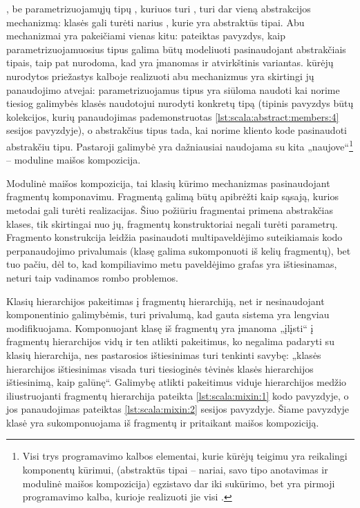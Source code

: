 , be parametrizuojamųjų tipų , kuriuos
turi , turi dar vieną abstrakcijos mechanizmą:
 klasės gali turėti narius , kurie
yra abstraktūs tipai. Abu mechanizmai yra pakeičiami vienas kitu:
\cite[10]{scala-overview} pateiktas pavyzdys, kaip parametrizuojamuosius
tipus galima būtų modeliuoti pasinaudojant abstrakčiais tipais, taip
pat nurodoma, kad yra įmanomas ir atvirkštinis variantas.
 kūrėjų \cite[11]{scala-overview} nurodytos
priežastys kalboje realizuoti abu mechanizmus yra skirtingi jų
panaudojimo atvejai: parametrizuojamus tipus yra siūloma naudoti kai
norime tiesiog galimybės klasės naudotojui nurodyti konkretų tipą
(tipinis pavyzdys būtų kolekcijos, kurių panaudojimas pademonstruotas
\ref{lst:scala:abstract:members:4}  sesijos
pavyzdyje), o abstrakčius tipus tada, kai norime kliento kode
pasinaudoti abstrakčiu tipu. Pastaroji galimybė yra dažniausiai
naudojama su kita  „naujove“\footnote{
Visi trys programavimo kalbos elementai, kurie 
kūrėjų teigimu yra reikalingi komponentų kūrimui, (abstraktūs
tipai – nariai, savo tipo anotavimas ir modulinė maišos kompozicija)
egzistavo dar iki  sukūrimo, bet 
yra pirmoji programavimo kalba, kurioje realizuoti jie visi
\cite[2]{scalable-component-abstractions}.} – moduline maišos
kompozicija.

\begin{scalainterpreterlisting}
  \label{lst:scala:abstract:members:4}
\end{scalainterpreterlisting}

Modulinė maišos kompozicija, tai klasių kūrimo mechanizmas
pasinaudojant fragmentų  komponavimu. Fragmentą galimą
būtų apibrėžti kaip sąsają, kurios metodai gali turėti
realizacijas. Šiuo požiūriu fragmentai primena abstrakčias klases,
tik skirtingai nuo jų, fragmentų konstruktoriai negali turėti
parametrų. Fragmento konstrukcija leidžia pasinaudoti
multipaveldėjimo suteikiamais kodo perpanaudojimo privalumais
(klasę galima sukomponuoti iš kelių fragmentų), bet tuo pačiu, dėl
to, kad kompiliavimo metu paveldėjimo grafas yra ištiesinamas, neturi
taip vadinamos rombo problemos.

Klasių hierarchijos pakeitimas į fragmentų hierarchiją, net ir
nesinaudojant komponentinio galimybėmis, turi privalumą, kad
gauta sistema yra lengviau modifikuojama. Komponuojant klasę iš
fragmentų yra įmanoma „įlįsti“ į fragmentų hierarchijos vidų
ir ten atlikti pakeitimus, ko negalima padaryti su klasių hierarchija,
nes pastarosios ištiesinimas turi tenkinti savybę: „klasės hierarchijos
ištiesinimas visada turi tiesioginės tėvinės klasės hierarchijos
ištiesinimą, kaip galūnę“\cite[57]{scala-reference}. Galimybę
atlikti pakeitimus viduje hierarchijos medžio iliustruojanti fragmentų
hierarchija pateikta \ref{lst:scala:mixin:1} kodo pavyzdyje,
o jos panaudojimas pateiktas \ref{lst:scala:mixin:2} 
sesijos pavyzdyje. Šiame pavyzdyje klasė  yra sukomponuojama
iš fragmentų  ir  pritaikant maišos kompoziciją.

